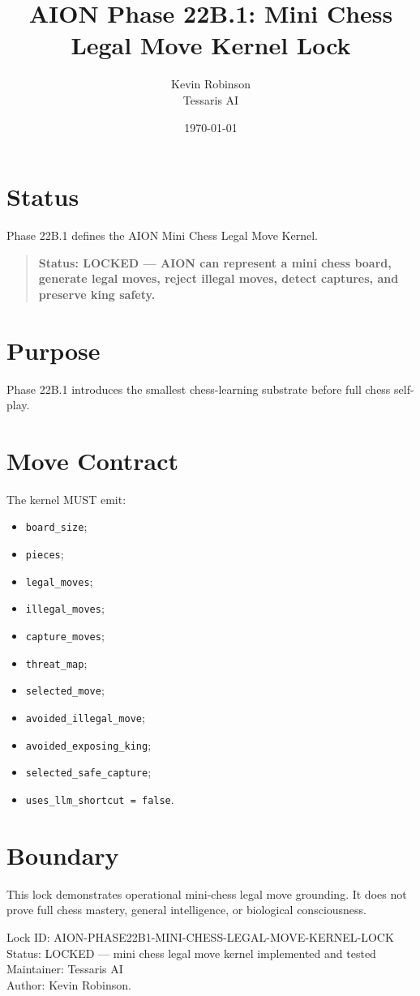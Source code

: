 \documentclass[11pt,a4paper]{article}
\title{\textbf{AION Phase 22B.1: Mini Chess Legal Move Kernel Lock}}
\author{Kevin Robinson\\Tessaris AI}
\date{\today}
\begin{document}
\maketitle

\section{Status}

Phase 22B.1 defines the AION Mini Chess Legal Move Kernel.

\begin{quote}
\textbf{Status: LOCKED --- AION can represent a mini chess board, generate legal moves, reject illegal moves, detect captures, and preserve king safety.}
\end{quote}

\section{Purpose}

Phase 22B.1 introduces the smallest chess-learning substrate before full chess self-play.

\section{Move Contract}

The kernel MUST emit:

\begin{itemize}
  \item \texttt{board\_size};
  \item \texttt{pieces};
  \item \texttt{legal\_moves};
  \item \texttt{illegal\_moves};
  \item \texttt{capture\_moves};
  \item \texttt{threat\_map};
  \item \texttt{selected\_move};
  \item \texttt{avoided\_illegal\_move};
  \item \texttt{avoided\_exposing\_king};
  \item \texttt{selected\_safe\_capture};
  \item \texttt{uses\_llm\_shortcut = false}.
\end{itemize}

\section{Boundary}

This lock demonstrates operational mini-chess legal move grounding. It does not prove full chess mastery, general intelligence, or biological consciousness.

\bigskip

\noindent
Lock ID: AION-PHASE22B1-MINI-CHESS-LEGAL-MOVE-KERNEL-LOCK\\
Status: LOCKED --- mini chess legal move kernel implemented and tested\\
Maintainer: Tessaris AI\\
Author: Kevin Robinson.
\end{document}

